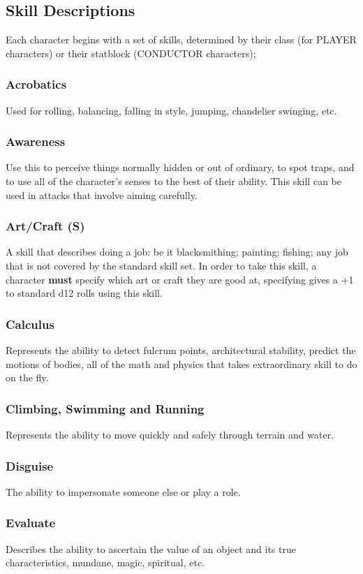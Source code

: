 \subsection{Skill Descriptions}
Each character begins with a set of skills, determined by their class (for PLAYER characters) or their statblock (CONDUCTOR characters);
\begin{multicols}{2}
\subsubsection*{Acrobatics}
Used for rolling, balancing, falling in style, jumping, chandelier swinging, etc.
\subsubsection*{Awareness}
Use this to perceive things normally hidden or out of ordinary, to spot traps, and to use all of the character's senses to the best of their ability. This skill can be used in attacks that involve aiming carefully.
\subsubsection*{Art/Craft (S)}
A skill that describes doing a job: be it blacksmithing; painting; fishing; any job that is not covered by the standard skill set. In order to take this skill, a character \textbf{must} specify which art or craft they are good at, specifying gives a +1 to standard d12 rolls using this skill.
\subsubsection*{Calculus}
Represents the ability to detect fulcrum points, architectural stability, predict the motions of bodies, all of the math and physics that takes extraordinary skill to do on the fly.
\subsubsection*{Climbing, Swimming and Running}
Represents the ability to move quickly and safely through terrain and water.
\subsubsection*{Disguise}
The ability to impersonate someone else or play a role.
\subsubsection*{Evaluate}
Describes the ability to ascertain the value of an object and its true characteristics, mundane, magic, spiritual, etc.

\end{multicols}
